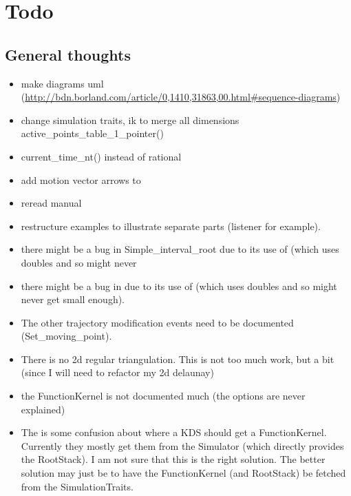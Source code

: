 \section{Todo}

\subsection{General thoughts}

\begin{itemize}

\item make diagrams uml (\url{http://bdn.borland.com/article/0,1410,31863,00.html#sequence-diagrams})

\item change simulation traits, ik to merge all dimensions active\_points\_table\_1\_pointer()

\item current\_time\_nt() instead of rational

\item add motion vector arrows to 

\item reread manual

\item restructure examples to illustrate separate parts (listener for example).

\item there might be a bug in Simple\_interval\_root due to its use of
   (which uses doubles and so might never

\item there might be a bug in  due to its use of
   (which uses doubles and so might never
  get small enough).

\item The other trajectory modification events need to be documented
  (Set\_moving\_point). 

\item There is no 2d regular triangulation. This is not too much work,
  but a bit (since I will need to refactor my 2d delaunay)

\item the FunctionKernel is not documented much (the options are never
  explained)

\item The is some confusion about where a KDS should get a
  FunctionKernel. Currently they mostly get them from the Simulator
  (which directly provides the RootStack). I am not sure that this is
  the right solution. The better solution may just be to have the
  FunctionKernel (and RootStack) be fetched from the SimulationTraits.


\end{itemize}
